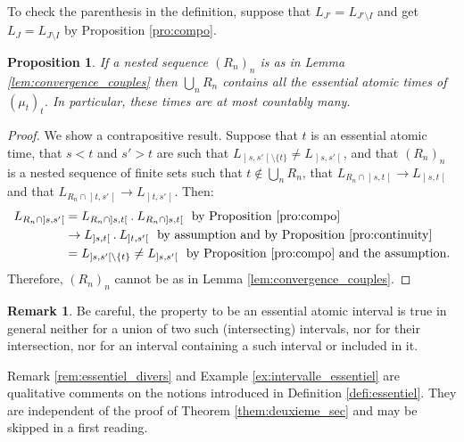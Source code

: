 \documentclass[JEP,XML,SOM,Unicode,NoEqCountersInSection,NoFloatCountersInSection,published]{cedram}
\newcommand{\ldot}{\mathbin{.}}
\theoremstyle{plain}
\newtheorem{pro}[them]{Proposition}
\theoremstyle{definition}
\newtheorem{rem}[them]{Remark}
\newcommand{\op}{\mathopen}
\newcommand{\clo}{\mathclose}
\begin{document}
To check the parenthesis in the definition, suppose that $L_{J'}= L_{J'\setminus I}$ and get $L_{J}= L_{J\setminus I}$ by Proposition \ref{pro:compo}.

\begin{pro}\label{pro:denombrable}If a nested sequence $(R_n)_n$ is as in Lemma \ref{lem:convergence_couples} then $\bigcup_nR_n$ contains all the essential atomic times of $(\mu_t)_t$. In particular, these times are at most countably many.
\end{pro}

\begin{proof}We show a contrapositive result. Suppose that $t$ is an essential atomic time, that $s<t$ and $s'>t$ are such that $L_{\op]s,s'\clo[\setminus\{t\}}\neq L_{\op]s,s'\clo[}$, and that $(R_n)_n$ is a nested sequence of finite sets such that $t\not\in\bigcup_nR_n$, that $L_{R_n\cap\op]s,t\clo[}\to L_{\op]s,t\clo[}$ and that $L_{R_n\cap\op]t,s'\clo[}\to L_{\op]t,s'\clo[}$. Then:
\begin{align*}
L_{R_n\cap\op]s,s'\clo[}&=L_{R_n\cap\op]s,t\clo[}{}\ldot L_{R_n\cap\op]s,t\clo[}\ \ \text{by Proposition \ref{pro:compo}}\\
&\to L_{\op]s,t\clo[}{}\ldot L_{\op]t,s'\clo[}\ \ \text{by assumption and by Proposition \ref{pro:continuity}}\\
&=L_{\op]s,s'\clo[\setminus\{t\}}\neq L_{\op]s,s'\clo[}\ \ \text{by Proposition \ref{pro:compo} and the assumption}.
\end{align*}
Therefore, $(R_n)_n$ cannot be as in Lemma \ref{lem:convergence_couples}.
\end{proof}

\begin{rem}\label{rem:intervalles_essentiels} Be careful, the property to be an essential atomic interval is true in general neither for a union of two such (intersecting) intervals, nor for their intersection, nor for an interval containing a such interval or included in it.
\end{rem}

Remark \ref{rem:essentiel_divers} and Example \ref{ex:intervalle_essentiel} are qualitative comments on the notions introduced in Definition \ref{defi:essentiel}. They are independent of the proof of Theorem \ref{them:deuxieme_sec} and may be skipped in a first reading.
\end{document}
